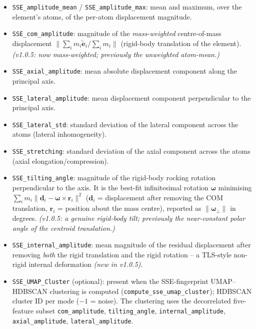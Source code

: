 \documentclass[10pt,a4paper,twoside]{article}
\newcommand{\evec}{\mathbf{e}}
\newcommand{\fn}[1]{\texttt{#1}}
\begin{document}
\begin{itemize}
  \item \texttt{SSE\_amplitude\_mean} / \texttt{SSE\_amplitude\_max}:
        mean and maximum, over the element's atoms, of the per-atom
        displacement magnitude.
  \item \texttt{SSE\_com\_amplitude}: magnitude of the \emph{mass-weighted}
        centre-of-mass displacement
        $\lVert \sum_i m_i \widetilde{\evec}_i / \sum_i m_i \rVert$
        (rigid-body translation of the element). \emph{(v1.0.5: now
        mass-weighted; previously the unweighted atom-mean.)}
  \item \texttt{SSE\_axial\_amplitude}: mean absolute displacement
        component along the principal axis.
  \item \texttt{SSE\_lateral\_amplitude}: mean displacement component
        perpendicular to the principal axis.
  \item \texttt{SSE\_lateral\_std}: standard deviation of the lateral
        component across the atoms (lateral inhomogeneity).
  \item \texttt{SSE\_stretching}: standard deviation of the axial
        component across the atoms (axial elongation/compression).
  \item \texttt{SSE\_tilting\_angle}: magnitude of the rigid-body rocking
        rotation perpendicular to the axis. It is the best-fit
        infinitesimal rotation $\bm{\omega}$ minimising
        $\sum_i m_i \lVert \mathbf{d}_i - \bm{\omega}\times\mathbf{r}_i \rVert^2$
        ($\mathbf{d}_i$ = displacement after removing the COM translation,
        $\mathbf{r}_i$ = position about the mass centre), reported as
        $\lVert\bm{\omega}_\perp\rVert$ in degrees. \emph{(v1.0.5: a genuine
        rigid-body tilt; previously the near-constant polar angle of the
        centroid translation.)}
  \item \texttt{SSE\_internal\_amplitude}: mean magnitude of the residual
        displacement after removing \emph{both} the rigid translation and
        the rigid rotation -- a TLS-style non-rigid internal deformation
        \emph{(new in v1.0.5)}.
  \item \texttt{SSE\_UMAP\_Cluster} (optional): present when the
        SSE-fingerprint UMAP--HDBSCAN clustering is computed
        (\fn{compute\_sse\_umap\_cluster}); HDBSCAN cluster ID per mode
        ($-1$ = noise). The clustering uses the decorrelated five-feature
        subset \texttt{com\_amplitude}, \texttt{tilting\_angle},
        \texttt{internal\_amplitude}, \texttt{axial\_amplitude},
        \texttt{lateral\_amplitude}.
\end{itemize}
\end{document}
